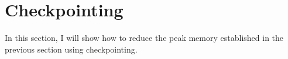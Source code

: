 \section{Checkpointing} \label{sec:bg-checkpointing}
In this section, I will show how to reduce the peak memory established in the previous section using checkpointing.



